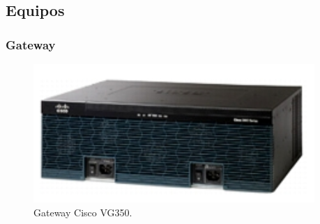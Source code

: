 \documentclass[12pt,letterpaper]{article}
\begin{document}
\newpage
\subsection{Equipos}
\subsubsection{Gateway}
\begin{figure}[ht]
    \centering
    \includegraphics[width=.4\textwidth]{imagenes/gateway.PNG}
    \caption{Gateway Cisco VG350.}
\end{figure}
\end{document}

